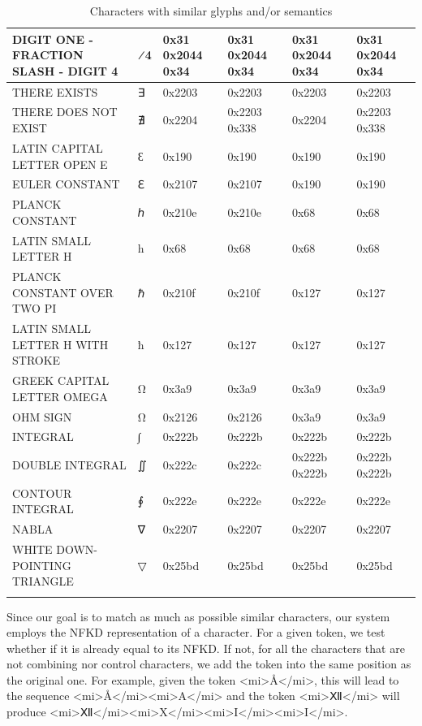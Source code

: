 \begin{longtable}{|m{4cm}|>{\centering\arraybackslash}m{2.15cm}|>{\centering\arraybackslash}m{1.65cm}|>{\centering\arraybackslash}m{1.65cm}|>{\centering\arraybackslash}m{1.65cm}|>{\centering\arraybackslash}m{1.65cm}|}
\hline
DIGIT ONE - FRACTION SLASH - DIGIT 4 & 1⁄4 &	0x31 0x2044 0x34 &	0x31 0x2044 0x34 &	0x31 0x2044 0x34 &	0x31 0x2044 0x34 \\
\hline
THERE EXISTS	& {\unicodefont ∃}&	0x2203 &	0x2203 &	0x2203 &	0x2203 \\
\hline
THERE DOES NOT EXIST	& {\unicodefont ∄} & 	0x2204	& 0x2203 0x338& 	0x2204 &	0x2203 0x338\\
\hline
LATIN CAPITAL LETTER OPEN E	& {\unicodefont Ɛ} &	0x190 &	0x190 &	0x190 &	0x190 \\
\hline
EULER CONSTANT	& {\unicodefont ℇ} & 0x2107 & 0x2107 & 0x190 & 0x190 \\
\hline
PLANCK CONSTANT	& {\unicodefont ℎ} &	0x210e &	0x210e &	0x68 &	0x68 \\
\hline
LATIN SMALL LETTER H &	h &	0x68 &	0x68 &	0x68 &	0x68 \\
\hline
PLANCK CONSTANT OVER TWO PI	& {\unicodefont ℏ} &	0x210f &	0x210f	& 0x127 &	0x127 \\
\hline
LATIN SMALL LETTER H WITH STROKE & ħ &	0x127	& 0x127	& 0x127	& 0x127 \\
\hline
GREEK CAPITAL LETTER OMEGA	& Ω &	0x3a9 &	0x3a9 &	0x3a9 &	0x3a9 \\
\hline
OHM SIGN & Ω &	0x2126 &	0x2126 &	0x3a9 &	0x3a9 \\
\hline
INTEGRAL & {\unicodefont ∫} &	0x222b &	0x222b &	0x222b &	0x222b \\
\hline
DOUBLE INTEGRAL	& {\unicodefont ∬} & 	0x222c &	0x222c &	0x222b 0x222b &	0x222b 0x222b \\
\hline
CONTOUR INTEGRAL	& {\unicodefont ∮} &	0x222e	 &0x222e &	0x222e &	0x222e \\
\hline
NABLA	& {\unicodefont ∇} &	0x2207	 &0x2207 &	0x2207 &	0x2207 \\
\hline
WHITE DOWN-POINTING TRIANGLE	& {\unicodefont ▽} &	0x25bd	 &0x25bd &	0x25bd &	0x25bd \\
\hline

\caption{Characters with similar glyphs and/or semantics}
\label{unicode_characters}
\end{longtable}


Since our goal is to match as much as possible similar characters, our system employs the NFKD representation of a character. For a given token, we test whether if it is already equal to its NFKD. If not, for all the characters that are not combining nor control characters, we add the token into the same position as the original one.
For example, given the token <mi>\r{A}</mi>, this will lead to the sequence <mi>\r{A}</mi><mi>A</mi> and the token <mi>{\unicodefontⅫ}</mi> will produce <mi>{\unicodefontⅫ}</mi><mi>X</mi><mi>I</mi><mi>I</mi>.

